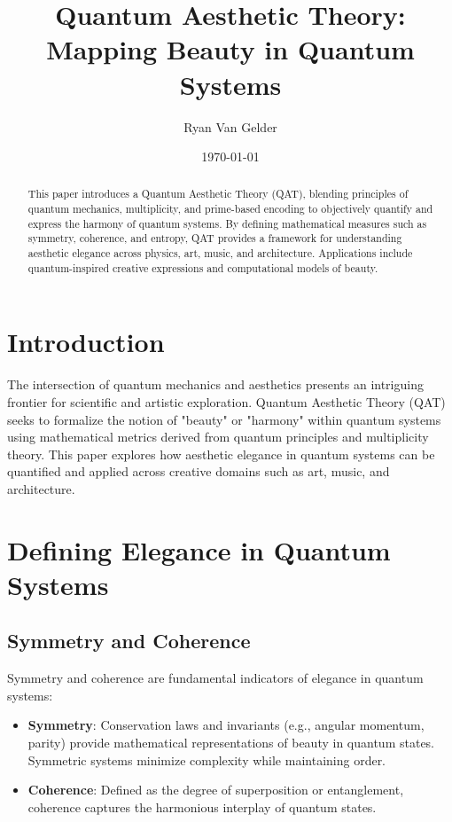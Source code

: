 \documentclass{article}
\theoremstyle{plain}
\begin{document}
\title{Quantum Aesthetic Theory: Mapping Beauty in Quantum Systems}

\author{Ryan Van Gelder}
\date{\today}
\maketitle

\begin{abstract}
This paper introduces a Quantum Aesthetic Theory (QAT), blending principles of quantum mechanics, multiplicity, and prime-based encoding to objectively quantify and express the harmony of quantum systems. By defining mathematical measures such as symmetry, coherence, and entropy, QAT provides a framework for understanding aesthetic elegance across physics, art, music, and architecture. Applications include quantum-inspired creative expressions and computational models of beauty.
\end{abstract}

\section{Introduction}
The intersection of quantum mechanics and aesthetics presents an intriguing frontier for scientific and artistic exploration. Quantum Aesthetic Theory (QAT) seeks to formalize the notion of "beauty" or "harmony" within quantum systems using mathematical metrics derived from quantum principles and multiplicity theory. This paper explores how aesthetic elegance in quantum systems can be quantified and applied across creative domains such as art, music, and architecture.

\section{Defining Elegance in Quantum Systems}

\subsection{Symmetry and Coherence}
Symmetry and coherence are fundamental indicators of elegance in quantum systems:
\begin{itemize}
    \item \textbf{Symmetry}: Conservation laws and invariants (e.g., angular momentum, parity) provide mathematical representations of beauty in quantum states. Symmetric systems minimize complexity while maintaining order.
    \item \textbf{Coherence}: Defined as the degree of superposition or entanglement, coherence captures the harmonious interplay of quantum states.
\end{itemize}
\end{document}
